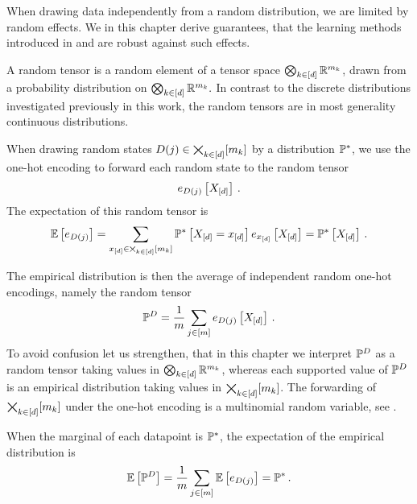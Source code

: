 \chapter{\chatextconcentration}\label{cha:concentration}

When drawing data independently from a random distribution, we are limited by random effects.
We in this chapter derive guarantees, that the learning methods introduced in  and  are robust against such effects.


A random tensor is a random element of a tensor space $\bigotimes_{k\in[d]} \mathbb{R}^{m_{k}}$, drawn from a probability distribution on $\bigotimes_{k\in[d]} \mathbb{R}^{m_{k}}.$
In contrast to the discrete distributions investigated previously in this work, the random tensors are in most generality continuous distributions. %


When drawing random states $D(j)\in\bigtimes_{k\in[d]}[m_{k}]$ by a distribution $\mathbb{P}^*$, we use the one-hot encoding to forward each random state to the random tensor
\[ e_{D(j)}\left[X_{[d]}\right] \, . \]
The expectation of this random tensor is
\begin{align*}
    \mathbb{E}\left[e_{D(j)}\right]
    = \sum_{x_{[d]}\in\bigtimes_{k\in[d]}[m_{k}]} \mathbb{P}^*\left[X_{[d]}=x_{[d]}\right] e_{x_{[d]}}\left[X_{[d]}\right]
    = \mathbb{P}^*\left[X_{[d]}\right] \, .
\end{align*}

The empirical distribution is then the average of independent random one-hot encodings, namely the random tensor
\[ \mathbb{P}^{D} = \frac{1}{m} \sum_{j\in[m]}  e_{D(j)}\left[X_{[d]}\right] \, . \]
To avoid confusion let us strengthen, that in this chapter we interpret $\mathbb{P}^{D}$ as a random tensor taking values in $\bigotimes_{k\in[d]} \mathbb{R}^{m_{k}}$, whereas each supported value of $\mathbb{P}^{D}$ is an empirical distribution taking values in $\bigtimes_{k\in[d]}[m_{k}]$.
The forwarding of $\bigtimes_{k\in[d]}[m_{k}]$ under the one-hot encoding is a multinomial random variable, see .


When the marginal of each datapoint is $\mathbb{P}^*$, the expectation of the empirical distribution is
\begin{align*}
    \mathbb{E}\left[\mathbb{P}^{D}\right]
    = \frac{1}{m} \sum_{j\in[m]}  \mathbb{E}\left[e_{D(j)}\right]
    = \mathbb{P}^* \, .
\end{align*}

